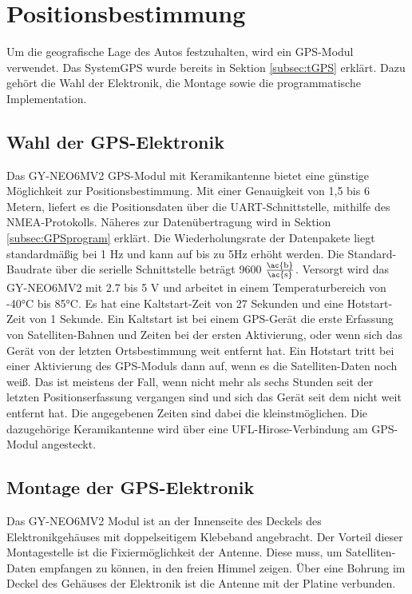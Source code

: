 \section{Positionsbestimmung}
\label{sec:GPS}
Um die geografische Lage des Autos festzuhalten, wird ein \ac{GPS}-Modul verwendet. Das System\ac{GPS} wurde bereits in Sektion \ref{subsec:tGPS} erklärt. Dazu gehört die Wahl der Elektronik, die Montage sowie die programmatische Implementation.

\subsection{Wahl der GPS-Elektronik}
\label{subsec:GPSchoice}
Das GY-NEO6MV2 \ac{GPS}-Modul mit Keramikantenne bietet eine günstige Möglichkeit zur Positionsbestimmung. Mit einer Genauigkeit von 1,5 bis 6 Metern, liefert es die Positionsdaten über die \ac{UART}-Schnittstelle, mithilfe des \ac{NMEA}-Protokolls. Näheres zur Datenübertragung wird in Sektion \ref{subsec:GPSprogram} erklärt. Die Wiederholungsrate der Datenpakete liegt standardmäßig bei 1 \ac{Hz} und kann auf bis zu 5\ac{Hz} erhöht werden. Die Standard-Baudrate über die serielle Schnittstelle beträgt 9600 $\frac{\mathrm{\ac{b}}}{\mathrm{\ac{s}}}$. Versorgt wird das GY-NEO6MV2 mit 2.7 bis 5 V und arbeitet in einem Temperaturbereich von -40°C bis 85°C. Es hat eine Kaltstart-Zeit von 27 Sekunden und eine Hotstart-Zeit von 1 Sekunde. Ein Kaltstart ist bei einem GPS-Gerät die erste Erfassung von Satelliten-Bahnen und Zeiten bei der ersten Aktivierung, oder wenn sich das Gerät von der letzten Ortsbestimmung weit entfernt hat. Ein Hotstart tritt bei einer Aktivierung des GPS-Moduls dann auf, wenn es die Satelliten-Daten noch weiß. Das ist meistens der Fall, wenn nicht mehr als sechs Stunden seit der letzten Positionserfassung vergangen sind und sich das Gerät seit dem nicht weit entfernt hat. Die angegebenen Zeiten sind dabei die kleinstmöglichen. Die dazugehörige Keramikantenne wird über eine UFL-Hirose-Verbindung am GPS-Modul angesteckt. 

\subsection{Montage der GPS-Elektronik}
\label{subsec:GPSmount}
Das GY-NEO6MV2 Modul ist an der Innenseite des Deckels des Elektronikgehäuses mit doppelseitigem Klebeband angebracht. Der Vorteil dieser Montagestelle ist die Fixiermöglichkeit der Antenne. Diese muss, um Satelliten-Daten empfangen zu können, in den freien Himmel zeigen. Über eine Bohrung im Deckel des Gehäuses der Elektronik ist die Antenne mit der Platine verbunden.

